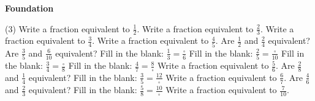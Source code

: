 \documentclass[17pt,a4paper,landscape]{extarticle}
\begin{document}
\sffamily
\boldmath

\boldmath

\boldmath

\boldmath

\boldmath

\boldmath

\boldmath

\boldmath

\boldmath

\boldmath

\boldmath

\boldmath

\boldmath

\boldmath

\boldmath

\boldmath

\boldmath

\boldmath

\boldmath

\boldmath

\boldmath

\boldmath

\vspace*{0.4em}
{\LARGE \textbf{Foundation}}
\begin{tasks}(3)
\task Write a fraction equivalent to \mbox{$\frac{1}{2}$}.
\task Write a fraction equivalent to \mbox{$\frac{2}{3}$}.
\task Write a fraction equivalent to \mbox{$\frac{3}{4}$}.
\task Write a fraction equivalent to \mbox{$\frac{4}{5}$}.
\task Are \mbox{$\frac{1}{2}$} and \mbox{$\frac{2}{4}$} equivalent?
\task Are \mbox{$\frac{3}{5}$} and \mbox{$\frac{6}{10}$} equivalent?
\task Fill in the blank: \mbox{$\frac{1}{3} = \frac{\square}{6}$}
\task Fill in the blank: \mbox{$\frac{2}{5} = \frac{\square}{10}$}
\task Fill in the blank: \mbox{$\frac{3}{4} = \frac{\square}{8}$}
\task Fill in the blank: \mbox{$\frac{4}{7} = \frac{8}{\square}$}
\task Write a fraction equivalent to \mbox{$\frac{5}{6}$}.
\task Are \mbox{$\frac{2}{8}$} and \mbox{$\frac{1}{4}$} equivalent?
\task Fill in the blank: \mbox{$\frac{3}{5} = \frac{12}{\square}$}
\task Write a fraction equivalent to \mbox{$\frac{6}{7}$}.
\task Are \mbox{$\frac{4}{6}$} and \mbox{$\frac{2}{3}$} equivalent?
\task Fill in the blank: \mbox{$\frac{5}{8} = \frac{10}{\square}$}
\task Write a fraction equivalent to \mbox{$\frac{7}{10}$}.
\end{tasks}
\end{document}
